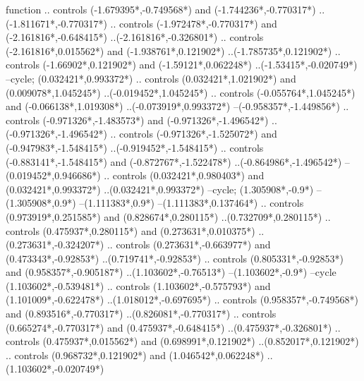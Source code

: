 {\begin{scope}[x=1mm,y=1mm,line width=\SCstroke mm,line cap=round,line join=round]
\begin{SCpart}{function}
.. controls ({-1.679395*\SCF},{-0.749568*\SCF}) and ({-1.744236*\SCF},{-0.770317*\SCF}) ..({-1.811671*\SCF},{-0.770317*\SCF})
.. controls ({-1.972478*\SCF},{-0.770317*\SCF}) and ({-2.161816*\SCF},{-0.648415*\SCF}) ..({-2.161816*\SCF},{-0.326801*\SCF})
.. controls ({-2.161816*\SCF},{0.015562*\SCF}) and ({-1.938761*\SCF},{0.121902*\SCF}) ..({-1.785735*\SCF},{0.121902*\SCF})
.. controls ({-1.66902*\SCF},{0.121902*\SCF}) and ({-1.59121*\SCF},{0.062248*\SCF}) ..({-1.53415*\SCF},{-0.020749*\SCF})
--cycle;
 ({0.032421*\SCF},{0.993372*\SCF})
.. controls ({0.032421*\SCF},{1.021902*\SCF}) and ({0.009078*\SCF},{1.045245*\SCF}) ..({-0.019452*\SCF},{1.045245*\SCF})
.. controls ({-0.055764*\SCF},{1.045245*\SCF}) and ({-0.066138*\SCF},{1.019308*\SCF}) ..({-0.073919*\SCF},{0.993372*\SCF})
--({-0.958357*\SCF},{-1.449856*\SCF})
.. controls ({-0.971326*\SCF},{-1.483573*\SCF}) and ({-0.971326*\SCF},{-1.496542*\SCF}) ..({-0.971326*\SCF},{-1.496542*\SCF})
.. controls ({-0.971326*\SCF},{-1.525072*\SCF}) and ({-0.947983*\SCF},{-1.548415*\SCF}) ..({-0.919452*\SCF},{-1.548415*\SCF})
.. controls ({-0.883141*\SCF},{-1.548415*\SCF}) and ({-0.872767*\SCF},{-1.522478*\SCF}) ..({-0.864986*\SCF},{-1.496542*\SCF})
--({0.019452*\SCF},{0.946686*\SCF})
.. controls ({0.032421*\SCF},{0.980403*\SCF}) and ({0.032421*\SCF},{0.993372*\SCF}) ..({0.032421*\SCF},{0.993372*\SCF})
--cycle;
 ({1.305908*\SCF},{-0.9*\SCF})
--({1.305908*\SCF},{0.9*\SCF})
--({1.111383*\SCF},{0.9*\SCF})
--({1.111383*\SCF},{0.137464*\SCF})
.. controls ({0.973919*\SCF},{0.251585*\SCF}) and ({0.828674*\SCF},{0.280115*\SCF}) ..({0.732709*\SCF},{0.280115*\SCF})
.. controls ({0.475937*\SCF},{0.280115*\SCF}) and ({0.273631*\SCF},{0.010375*\SCF}) ..({0.273631*\SCF},{-0.324207*\SCF})
.. controls ({0.273631*\SCF},{-0.663977*\SCF}) and ({0.473343*\SCF},{-0.92853*\SCF}) ..({0.719741*\SCF},{-0.92853*\SCF})
.. controls ({0.805331*\SCF},{-0.92853*\SCF}) and ({0.958357*\SCF},{-0.905187*\SCF}) ..({1.103602*\SCF},{-0.76513*\SCF})
--({1.103602*\SCF},{-0.9*\SCF})
--cycle
({1.103602*\SCF},{-0.539481*\SCF})
.. controls ({1.103602*\SCF},{-0.575793*\SCF}) and ({1.101009*\SCF},{-0.622478*\SCF}) ..({1.018012*\SCF},{-0.697695*\SCF})
.. controls ({0.958357*\SCF},{-0.749568*\SCF}) and ({0.893516*\SCF},{-0.770317*\SCF}) ..({0.826081*\SCF},{-0.770317*\SCF})
.. controls ({0.665274*\SCF},{-0.770317*\SCF}) and ({0.475937*\SCF},{-0.648415*\SCF}) ..({0.475937*\SCF},{-0.326801*\SCF})
.. controls ({0.475937*\SCF},{0.015562*\SCF}) and ({0.698991*\SCF},{0.121902*\SCF}) ..({0.852017*\SCF},{0.121902*\SCF})
.. controls ({0.968732*\SCF},{0.121902*\SCF}) and ({1.046542*\SCF},{0.062248*\SCF}) ..({1.103602*\SCF},{-0.020749*\SCF})

\end{SCpart}
\end{scope}}
